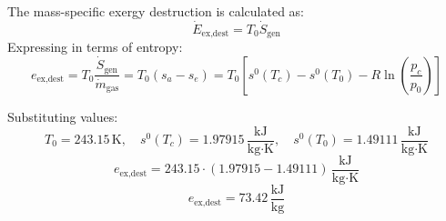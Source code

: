 The mass-specific exergy destruction is calculated as:  
\[
\dot{E}_{\text{ex,dest}} = T_0 \dot{S}_{\text{gen}}
\]  
Expressing in terms of entropy:  
\[
e_{\text{ex,dest}} = T_0 \frac{\dot{S}_{\text{gen}}}{\dot{m}_{\text{gas}}} = T_0 (s_{a} - s_{e}) = T_0 \left[ s^0(T_c) - s^0(T_0) - R \ln \left( \frac{p_c}{p_0} \right) \right]
\]  

Substituting values:  
\[
T_0 = 243.15 \, \text{K}, \quad s^0(T_c) = 1.97915 \, \frac{\text{kJ}}{\text{kg·K}}, \quad s^0(T_0) = 1.49111 \, \frac{\text{kJ}}{\text{kg·K}}
\]  
\[
e_{\text{ex,dest}} = 243.15 \cdot (1.97915 - 1.49111) \, \frac{\text{kJ}}{\text{kg·K}}
\]  
\[
e_{\text{ex,dest}} = 73.42 \, \frac{\text{kJ}}{\text{kg}}
\]